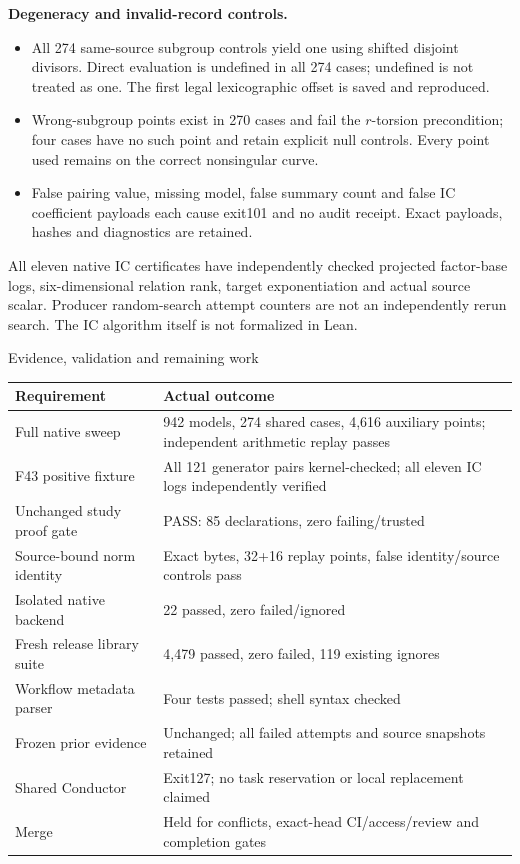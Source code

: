 \documentclass[10pt]{article}
\begin{document}
\textbf{Degeneracy and invalid-record controls.}
\begin{itemize}
\item All 274 same-source subgroup controls yield one using shifted disjoint
divisors. Direct evaluation is undefined in all 274 cases; undefined is not
treated as one. The first legal lexicographic offset is saved and reproduced.
\item Wrong-subgroup points exist in 270 cases and fail the $r$-torsion
precondition; four cases have no such point and retain explicit null controls.
Every point used remains on the correct nonsingular curve.
\item False pairing value, missing model, false summary count and false IC
coefficient payloads each cause exit101 and no audit receipt. Exact payloads,
hashes and diagnostics are retained.
\end{itemize}
All eleven native IC certificates have independently checked projected
factor-base logs, six-dimensional relation rank, target exponentiation and
actual source scalar. Producer random-search attempt counters are not an
independently rerun search. The IC algorithm itself is not formalized in Lean.

\newpage
\begin{center}{\Large Evidence, validation and remaining work}\end{center}
\begin{tabular}{p{.38\linewidth}p{.57\linewidth}}
\toprule
Requirement & Actual outcome\\\midrule
Full native sweep & 942 models, 274 shared cases, 4,616 auxiliary points; independent arithmetic replay passes\\
F43 positive fixture & All 121 generator pairs kernel-checked; all eleven IC logs independently verified\\
Unchanged study proof gate & PASS: 85 declarations, zero failing/trusted\\
Source-bound norm identity & Exact bytes, 32+16 replay points, false identity/source controls pass\\
Isolated native backend & 22 passed, zero failed/ignored\\
Fresh release library suite & 4,479 passed, zero failed, 119 existing ignores\\
Workflow metadata parser & Four tests passed; shell syntax checked\\
Frozen prior evidence & Unchanged; all failed attempts and source snapshots retained\\
Shared Conductor & Exit127; no task reservation or local replacement claimed\\
Merge & Held for conflicts, exact-head CI/access/review and completion gates\\\bottomrule
\end{tabular}
\end{document}
